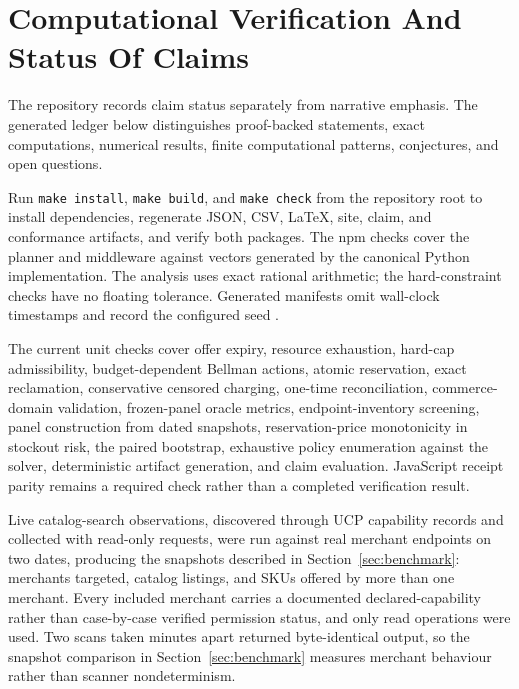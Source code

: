 \section{Computational Verification And Status Of Claims}

The repository records claim status separately from narrative emphasis. The
generated ledger below distinguishes proof-backed statements, exact computations,
numerical results, finite computational patterns, conjectures, and open questions.



Run \texttt{make install}, \texttt{make build}, and \texttt{make check} from the
repository root to install dependencies, regenerate JSON, CSV, \LaTeX{}, site,
claim, and conformance artifacts, and verify both packages.  The npm checks cover
the planner and middleware against vectors generated by the canonical Python
implementation.  The analysis uses exact rational arithmetic; the hard-constraint
checks have no floating tolerance.  Generated manifests omit wall-clock timestamps
and record the configured seed
\ResultRandomSeed{}.

The current unit checks cover offer expiry, resource exhaustion, hard-cap
admissibility, budget-dependent Bellman actions, atomic reservation, exact
reclamation, conservative censored charging, one-time reconciliation,
commerce-domain validation, frozen-panel oracle metrics, endpoint-inventory
screening, panel construction from dated snapshots, reservation-price monotonicity
in stockout risk, the paired bootstrap, exhaustive policy enumeration against the
solver, deterministic artifact generation, and claim evaluation.  JavaScript receipt
parity remains a required check rather than a completed verification result.

Live catalog-search observations, discovered through UCP capability records and
collected with read-only requests, were run against real merchant endpoints on two
dates, producing the snapshots described in
Section~\ref{sec:benchmark}: \ResultMerchantsTargeted{} merchants targeted,
\ResultCatalogRows{} catalog listings, and \ResultCrossMerchantSkus{} SKUs offered by
more than one merchant.  Every included merchant carries a documented
declared-capability rather than case-by-case verified permission status, and only
read operations were used.  Two scans taken minutes apart returned byte-identical
output, so the snapshot comparison in Section~\ref{sec:benchmark} measures merchant
behaviour rather than scanner nondeterminism.
